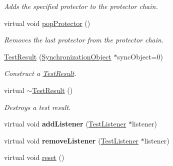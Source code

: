 \begin{DoxyCompactItemize}
\begin{DoxyCompactList}\small\item\em Adds the specified protector to the protector chain. \end{DoxyCompactList}\item 
\hypertarget{class_test_result_a3752e37de9f1e88e5c7ca05bb953d0bb}{virtual void \hyperlink{class_test_result_a3752e37de9f1e88e5c7ca05bb953d0bb}{pop\+Protector} ()}\label{class_test_result_a3752e37de9f1e88e5c7ca05bb953d0bb}

\begin{DoxyCompactList}\small\item\em Removes the last protector from the protector chain. \end{DoxyCompactList}\item 
\hypertarget{class_test_result_a51781d20e0edeceae06589f1d9c90b48}{\hyperlink{class_test_result_a51781d20e0edeceae06589f1d9c90b48}{Test\+Result} (\hyperlink{class_synchronized_object_1_1_synchronization_object}{Synchronization\+Object} $\ast$sync\+Object=0)}\label{class_test_result_a51781d20e0edeceae06589f1d9c90b48}

\begin{DoxyCompactList}\small\item\em Construct a \hyperlink{class_test_result}{Test\+Result}. \end{DoxyCompactList}\item 
\hypertarget{class_test_result_a318d2696f70564678f866bad6d5510b6}{virtual \hyperlink{class_test_result_a318d2696f70564678f866bad6d5510b6}{$\sim$\+Test\+Result} ()}\label{class_test_result_a318d2696f70564678f866bad6d5510b6}

\begin{DoxyCompactList}\small\item\em Destroys a test result. \end{DoxyCompactList}\item 
\hypertarget{class_test_result_aaa44db4de1b095eff670e433f12d51de}{virtual void {\bfseries add\+Listener} (\hyperlink{class_test_listener}{Test\+Listener} $\ast$listener)}\label{class_test_result_aaa44db4de1b095eff670e433f12d51de}

\item 
\hypertarget{class_test_result_a695fb70894352cead51d0db8ec59b3e8}{virtual void {\bfseries remove\+Listener} (\hyperlink{class_test_listener}{Test\+Listener} $\ast$listener)}\label{class_test_result_a695fb70894352cead51d0db8ec59b3e8}

\item 
\hypertarget{class_test_result_a5122b5d4edddb4b2d4ea9c214eed8c3f}{virtual void \hyperlink{class_test_result_a5122b5d4edddb4b2d4ea9c214eed8c3f}{reset} ()}\label{class_test_result_a5122b5d4edddb4b2d4ea9c214eed8c3f}


\end{DoxyCompactItemize}
